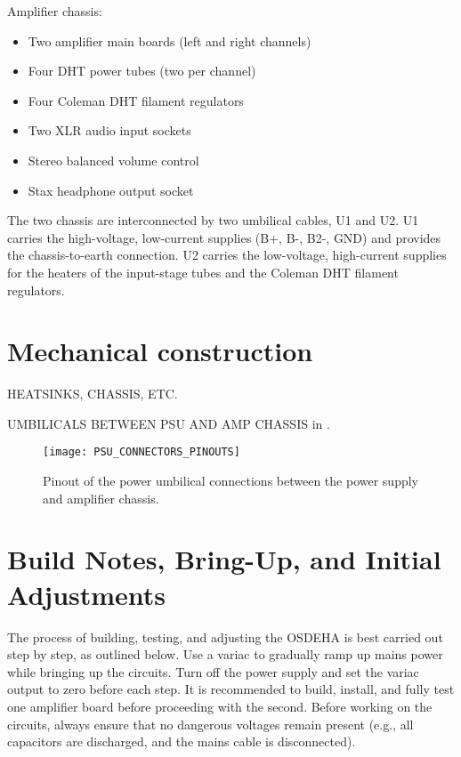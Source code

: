 Amplifier chassis:
\begin{itemize}
\item Two amplifier main boards (left and right channels)
\item Four DHT power tubes (two per channel)
\item Four Coleman DHT filament regulators
\item Two XLR audio input sockets
\item Stereo balanced volume control
\item Stax headphone output socket
\end{itemize}

The two chassis are interconnected by two umbilical cables, U1 and U2. U1 carries the high-voltage, low-current supplies (B+, B-, B2-, GND) and provides the chassis-to-earth connection. U2 carries the low-voltage, high-current supplies for the heaters of the input-stage tubes and the Coleman DHT filament regulators.


\section{Mechanical construction}

HEATSINKS, CHASSIS, ETC.

UMBILICALS BETWEEN PSU AND AMP CHASSIS in .

\begin{figure}
\begin{center}
\texttt{[image: PSU\_CONNECTORS\_PINOUTS]}
\caption{Pinout of the power umbilical connections between the power supply and amplifier chassis.}
\end{center}
\end{figure}


\section{Build Notes, Bring-Up, and Initial Adjustments}

The process of building, testing, and adjusting the OSDEHA is best carried out step by step, as outlined below. Use a variac to gradually ramp up mains power while bringing up the circuits. Turn off the power supply and set the variac output to zero before each step. It is recommended to build, install, and fully test one amplifier board before proceeding with the second. Before working on the circuits, always ensure that no dangerous voltages remain present (e.g., all capacitors are discharged, and the mains cable is disconnected).

